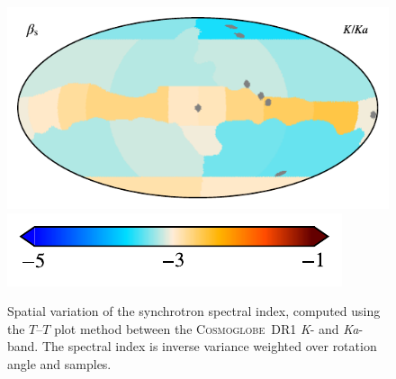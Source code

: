 \documentclass[twocolumn]{../../common/aa}
\newcommand{\Cosmoglobe}{\textsc{Cosmoglobe}}
\newcommand{\K}[0]{\textit K}
\newcommand{\Ka}[0]{\textit{Ka}}
\begin{document}
\begin{figure}
	\centering
	\includegraphics{figures/TT_map_CG_KKa.pdf}\vspace{-0.25cm}\\
	\hspace{0.25cm}\includegraphics{figures/cbar_beta_wide.pdf}
	\caption{Spatial variation of the synchrotron spectral index, computed using the $T$--$T$ plot method between the \Cosmoglobe\ DR1 \K- and \Ka-band. The spectral index is inverse variance weighted over rotation angle and samples.}
        \label{fig:beta_map}
\end{figure}


\end{document}

